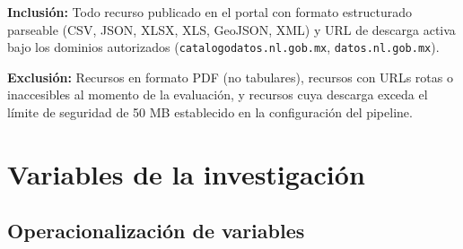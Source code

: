 \documentclass[12pt,letterpaper]{article}
\begin{document}
\textbf{Inclusión:} Todo recurso publicado en el portal con formato estructurado parseable (CSV, JSON, XLSX, XLS, GeoJSON, XML) y URL de descarga activa bajo los dominios autorizados (\texttt{catalogodatos.nl.gob.mx}, \texttt{datos.nl.gob.mx}).

\textbf{Exclusión:} Recursos en formato PDF (no tabulares), recursos con URLs rotas o inaccesibles al momento de la evaluación, y recursos cuya descarga exceda el límite de seguridad de 50 MB establecido en la configuración del pipeline.

\section{Variables de la investigación}

\subsection{Operacionalización de variables}
\end{document}
